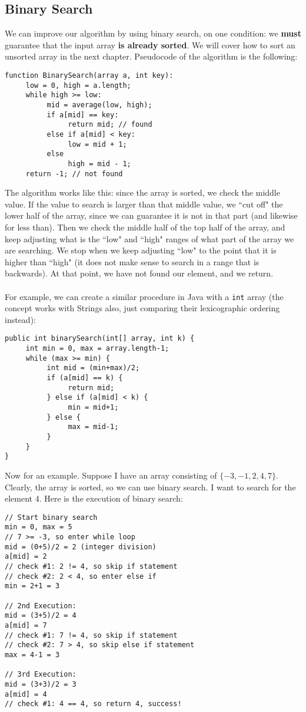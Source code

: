 \subsection{Binary Search}
We can improve our algorithm by using binary search, on one condition: we \textbf{must} guarantee that the input array \textbf{is already sorted}. We will cover how to sort an unsorted array in the next chapter. Pseudocode of the algorithm is the following:
\begin{verbatim}
function BinarySearch(array a, int key):
     low = 0, high = a.length;
     while high >= low:
          mid = average(low, high);
          if a[mid] == key:
               return mid; // found
          else if a[mid] < key:
               low = mid + 1;
          else
               high = mid - 1;
     return -1; // not found
\end{verbatim}
The algorithm works like this: since the array is sorted, we check the middle value. If the value to search is larger than that middle value, we ``cut off" the lower half of the array, since we can guarantee it is not in that part (and likewise for less than). Then we check the middle half of the top half of the array, and keep adjusting what is the ``low" and ``high" ranges of what part of the array we are searching. We stop when we keep adjusting ``low" to the point that it is higher than ``high" (it does not make sense to search in a range that is backwards). At that point, we have not found our element, and we return.
\\ \\
For example, we can create a similar procedure in Java with a \verb|int| array (the concept works with Strings also, just comparing their lexicographic ordering instead):
\begin{lstlisting}
public int binarySearch(int[] array, int k) {
     int min = 0, max = array.length-1;
     while (max >= min) {
          int mid = (min+max)/2;
          if (a[mid] == k) {
               return mid;
          } else if (a[mid] < k) {
               min = mid+1;
          } else {
               max = mid-1;
          }
     }
}
\end{lstlisting}
Now for an example. Suppose I have an array consisting of $\{-3, -1, 2, 4, 7\}$. Clearly, the array is sorted, so we can use binary search. I want to search for the element 4. Here is the execution of binary search:
\begin{verbatim}
// Start binary search
min = 0, max = 5
// 7 >= -3, so enter while loop
mid = (0+5)/2 = 2 (integer division)
a[mid] = 2
// check #1: 2 != 4, so skip if statement
// check #2: 2 < 4, so enter else if
min = 2+1 = 3

// 2nd Execution:
mid = (3+5)/2 = 4
a[mid] = 7
// check #1: 7 != 4, so skip if statement
// check #2: 7 > 4, so skip else if statement
max = 4-1 = 3

// 3rd Execution:
mid = (3+3)/2 = 3
a[mid] = 4
// check #1: 4 == 4, so return 4, success!
\end{verbatim}
